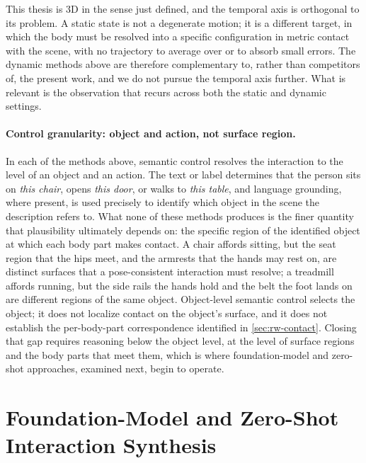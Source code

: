 This thesis is 3D in the sense just defined, and the temporal axis is orthogonal to its problem. A static state is not a degenerate motion; it is a different target, in which the body must be resolved into a specific configuration in metric contact with the scene, with no trajectory to average over or to absorb small errors. The dynamic methods above are therefore complementary to, rather than competitors of, the present work, and we do not pursue the temporal axis further. What is relevant is the observation that recurs across both the static and dynamic settings.

\paragraph{Control granularity: object and action, not surface region.} In each of the methods above, semantic control resolves the interaction to the level of an object and an action. The text or label determines that the person sits on \emph{this chair}, opens \emph{this door}, or walks to \emph{this table}, and language grounding, where present, is used precisely to identify which object in the scene the description refers to. What none of these methods produces is the finer quantity that plausibility ultimately depends on: the specific region of the identified object at which each body part makes contact. A chair affords sitting, but the seat region that the hips meet, and the armrests that the hands may rest on, are distinct surfaces that a pose-consistent interaction must resolve; a treadmill affords running, but the side rails the hands hold and the belt the foot lands on are different regions of the same object. Object-level semantic control selects the object; it does not localize contact on the object's surface, and it does not establish the per-body-part correspondence identified in \cref{sec:rw-contact}. Closing that gap requires reasoning below the object level, at the level of surface regions and the body parts that meet them, which is where foundation-model and zero-shot approaches, examined next, begin to operate.

\section{Foundation-Model and Zero-Shot Interaction Synthesis}
\label{sec:rw-zeroshot}

